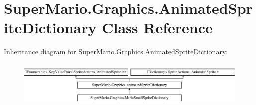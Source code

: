 \hypertarget{class_super_mario_1_1_graphics_1_1_animated_sprite_dictionary}{}\section{Super\+Mario.\+Graphics.\+Animated\+Sprite\+Dictionary Class Reference}
\label{class_super_mario_1_1_graphics_1_1_animated_sprite_dictionary}
Inheritance diagram for Super\+Mario.\+Graphics.\+Animated\+Sprite\+Dictionary\+:\begin{figure}[H]
\begin{center}
\leavevmode
\includegraphics[height=2.210526cm]{class_super_mario_1_1_graphics_1_1_animated_sprite_dictionary}
\end{center}
\end{figure}
